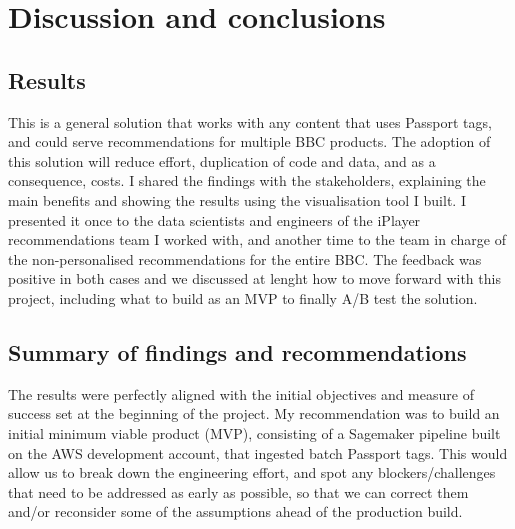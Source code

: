 \section{Discussion and conclusions}

\subsection{Results}

This is a general solution that works with any content that uses Passport tags,
and could serve recommendations for multiple BBC products.
The adoption of this solution will reduce effort, duplication of code and data, and as a consequence, costs.
I shared the findings with the stakeholders, explaining the main benefits and showing the results using the visualisation tool I built.
I presented it once to the data scientists and engineers of the iPlayer recommendations team I worked with,
and another time to the team in charge of the non-personalised recommendations for the entire BBC.
The feedback was positive in both cases and we discussed at lenght how to move forward with this project, including
what to build as an MVP to finally A/B test the solution.

\subsection{Summary of findings and recommendations}

The results were perfectly aligned with the initial objectives and measure of success set at the beginning of the project.
My recommendation was to build an initial minimum viable product (MVP), consisting of a Sagemaker pipeline
built on the AWS development account, that ingested batch Passport tags.
This would allow us to break down the engineering effort, and spot any blockers/challenges that need to be addressed
as early as possible, so that we can correct them and/or reconsider some of the assumptions ahead of the production build.

